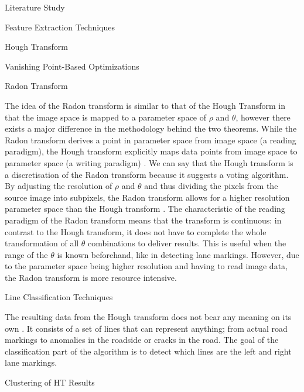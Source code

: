 \documentclass{matthijs}
\begin{document}
\begin{hoofdstuk}{Literature Study}
\begin{paragraaf}{Feature Extraction Techniques}
\begin{subparagraaf}{Hough Transform}
\begin{subsubparagraaf}{Vanishing Point-Based Optimizations}
				\end{subsubparagraaf}

			\end{subparagraaf}

			\begin{subparagraaf}{Radon Transform}

				The idea of the Radon transform is similar to that of the Hough Transform in that the image space is mapped to a parameter space of $\rho$ and $\theta$, however there exists a major difference in the methodology behind the two theorems.
				While the Radon transform derives a point in parameter space from image space (a reading paradigm), the Hough transform explicitly maps data points from image space to parameter space (a writing paradigm) \cite{orzechowski2014what} \cite{ginkel2004short}.
				We can say that the Hough transform is a discretisation of the Radon transform because it suggests a voting algorithm.
				By adjusting the resolution of $\rho$ and $\theta$ and thus dividing the pixels from the source image into subpixels, the Radon transform allows for a higher resolution parameter space than the Hough transform \cite{orzechowski2014what}.
				The characteristic of the reading paradigm of the Radon transform means that the transform is continuous: in contrast to the Hough transform, it does not have to complete the whole transformation of all $\theta$ combinations to deliver results.
				This is useful when the range of the $\theta$ is known beforehand, like in detecting lane markings.
				However, due to the parameter space being higher resolution and having to read image data, the Radon transform is more resource intensive.

			\end{subparagraaf}

		\end{paragraaf}

		\begin{paragraaf}{Line Classification Techniques}

			The resulting data from the Hough transform does not bear any meaning on its own \cite{gupta2016automated}.
			It consists of a set of lines that can represent anything; from actual road markings to anomalies in the roadside or cracks in the road.
			The goal of the classification part of the algorithm is to detect which lines are the left and right lane markings.

			\begin{subparagraaf}{Clustering of HT Results}


\end{subparagraaf}
\end{paragraaf}
\end{hoofdstuk}
\end{document}
